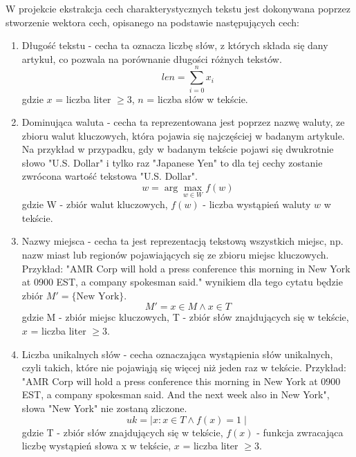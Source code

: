\documentclass{article}
\begin{document}
W projekcie ekstrakcja cech charakterystycznych tekstu jest dokonywana poprzez stworzenie wektora cech, opisanego na podstawie następujących cech:
\begin{enumerate}
    \item Długość tekstu - cecha ta oznacza liczbę słów, z których składa się dany artykuł, co pozwala na porównanie długości różnych tekstów.
        \begin{equation}
            len = \sum_{i=0}^{n} x_i
        \end{equation}
        gdzie \( x \) = liczba liter \( \geq 3 \), \( n \) = liczba słów w tekście.
    \item Dominująca waluta - cecha ta reprezentowana jest poprzez nazwę waluty, ze zbioru walut kluczowych, która pojawia się najczęściej w badanym artykule. Na przykład w przypadku, gdy w badanym tekście pojawi się dwukrotnie słowo "U.S. Dollar" i tylko raz "Japanese Yen" to dla tej cechy zostanie zwrócona wartość tekstowa "U.S. Dollar".
        \begin{equation}
            w = \arg\max_{w \in W} f(w)
        \end{equation}
        gdzie W - zbiór walut kluczowych, \( f(w) \)  - liczba wystąpień waluty \( w \) w tekście.
    \item Nazwy miejsca - cecha ta jest reprezentacją tekstową wszystkich miejsc, np. nazw miast lub regionów pojawiających się ze zbioru miejsc kluczowych. Przykład: "AMR Corp will hold a press conference this morning in New York at 0900 EST, a company spokesman said." wynikiem dla tego cytatu będzie zbiór \( M' = \{ \text{New York} \} \). 
        \begin{equation}
            M' =  x \in M  \land x \in T
        \end{equation}
        gdzie M - zbiór miejsc kluczowych, T - zbiór słów znajdujących się w tekście, \( x \) = liczba liter \( \geq 3 \).
    \item Liczba unikalnych słów - cecha oznaczająca wystąpienia słów unikalnych, czyli takich, które nie pojawiąją się więcej niż jeden raz w tekście. Przykład: "AMR Corp will hold a press conference this morning in New York at 0900 EST, a company spokesman said. And the next week also in New York", słowa "New York" nie zostaną zliczone.
        \begin{equation}
            uk = \mid x : x \in T \land f(x) = 1 \mid
        \end{equation}
        gdzie T - zbiór słów znajdujących się w tekście, \( f(x)\)  - funkcja zwracająca liczbę wystąpień słowa x w tekście, \( x \) = liczba liter \( \geq 3 \).

\end{enumerate}
\end{document}
